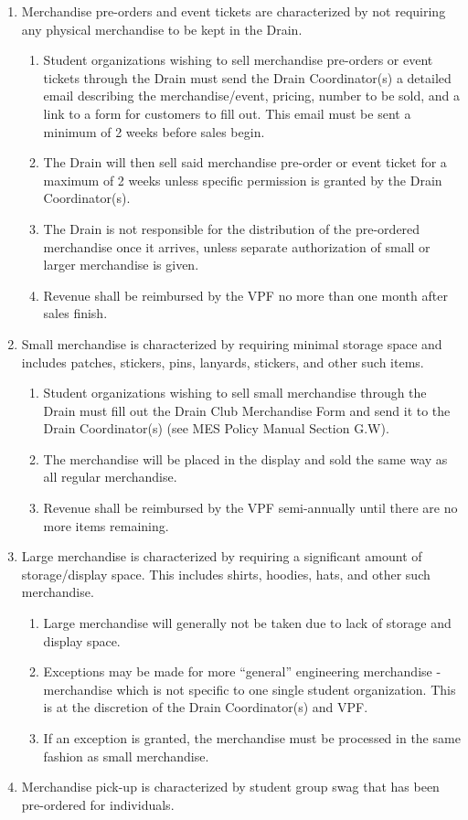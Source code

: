 \begin{enumerate}
 \item
  Merchandise pre-orders and event tickets are characterized by not requiring any physical merchandise to be kept in the Drain.

  \begin{enumerate}
   \item
    Student organizations wishing to sell merchandise pre-orders or event tickets through the Drain must send the Drain Coordinator(s) a detailed email describing the merchandise/event, pricing, number to be sold, and a link to a form for customers to fill out. This email must be sent a minimum of 2 weeks before sales begin.
   \item
    The Drain will then sell said merchandise pre-order or event ticket for a maximum of 2 weeks unless specific permission is granted by the Drain Coordinator(s).
   \item
    The Drain is not responsible for the distribution of the pre-ordered merchandise once it arrives, unless separate authorization of small or larger merchandise is given.
   \item
    Revenue shall be reimbursed by the VPF no more than one month after sales finish.
  \end{enumerate}
 \item
  Small merchandise is characterized by requiring minimal storage space and includes patches, stickers, pins, lanyards, stickers, and other such items.

  \begin{enumerate}
   \item
    Student organizations wishing to sell small merchandise through the Drain must fill out the Drain Club Merchandise Form and send it to the Drain Coordinator(s) (see MES Policy Manual Section G.W).
   \item
    The merchandise will be placed in the display and sold the same way as all regular merchandise.
   \item
    Revenue shall be reimbursed by the VPF semi-annually until there are no more items remaining.
  \end{enumerate}
 \item
  Large merchandise is characterized by requiring a significant amount of storage/display space. This includes shirts, hoodies, hats, and other such merchandise.

  \begin{enumerate}
   \item
    Large merchandise will generally not be taken due to lack of storage and display space.
   \item
    Exceptions may be made for more ``general'' engineering merchandise - merchandise which is not specific to one single student organization. This is at the discretion of the Drain Coordinator(s) and VPF.
   \item
    If an exception is granted, the merchandise must be processed in the same fashion as small merchandise.
  \end{enumerate}
 \item
  Merchandise pick-up is characterized by student group swag that has been pre-ordered for individuals.


\end{enumerate}
